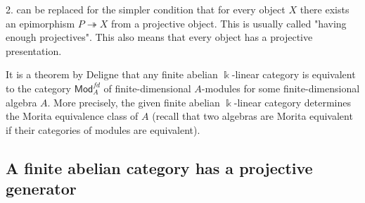\documentclass[11pt]{article}
\theoremstyle{definition}
\begin{document}
2. can be replaced for the simpler condition that for every object $X$ there exists an epimorphism $P \twoheadrightarrow X$ from a projective object. This is usually  called "having enough projectives". This also means that every object has a projective presentation.\medskip

It is a theorem by Deligne that any finite abelian \(\Bbbk\)-linear category is equivalent to the category \(\mathsf{Mod}_A^{fd}\) of finite-dimensional \(A\)-modules for some finite-dimensional algebra \(A\). More precisely, the given finite abelian \(\Bbbk\)-linear category determines the Morita equivalence class of \(A\) (recall that two algebras are Morita equivalent if their categories of modules are equivalent).


\subsection{A finite abelian category has a projective generator}
\end{document}
